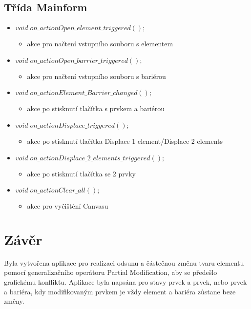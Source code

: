 \documentclass[oneside,12pt,a4paper]{book}
\begin{document}
   \section{Třída Mainform}
    \begin{itemize}

    \item $void\; on\_actionOpen\_element\_triggered();$
    \begin{itemize}
        \item  akce pro načtení vstupního souboru s elementem
    \end{itemize}
  
    \item $void\; on\_actionOpen\_barrier\_triggered();$
    \begin{itemize}
        \item  akce pro načtení vstupního souboru s bariérou
    \end{itemize}
    
    \item $void\; on\_actionElement\_Barrier\_changed();$
    \begin{itemize}
        \item  akce po stisknutí tlačítka s prvkem a bariérou
    \end{itemize}
    
    \item $void\; on\_actionDisplace\_triggered();$
    \begin{itemize}
        \item  akce po stisknutí tlačítka Displace 1 element/Displace 2 elements
    \end{itemize}

    \item $void\; on\_actionDisplace\_2\_elements\_triggered();$
    \begin{itemize}
        \item  akce po stisknutí tlačítka se 2 prvky
    \end{itemize}
        
    \item $void\; on\_actionClear\_all();$
    \begin{itemize}
        \item  akce pro vyčištění Canvasu
    \end{itemize}

\end{itemize}

\pagebreak
\chapter{Závěr} 
Byla vytvořena aplikace pro realizaci odsunu a částečnou změnu tvaru elementu pomocí generalizačního operátoru Partial Modification, aby se předešlo grafickému konfliktu. Aplikace byla napsána pro stavy prvek a prvek, nebo prvek a bariéra, kdy modifikovaným prvkem je vždy element a bariéra zůstane beze změny.\par



\begingroup
    \pageclear
    \printbibliography[title=Literatura]
\endgroup

\end{document}
